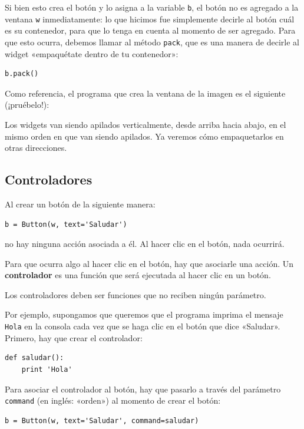 Si bien esto crea el botón y lo asigna a la variable \lstinline!b!, el
botón no es agregado a la ventana \lstinline!w! inmediatamente: lo que
hicimos fue simplemente decirle al botón cuál es su contenedor, para que
lo tenga en cuenta al momento de ser agregado. Para que esto ocurra,
debemos llamar al método \lstinline!pack!, que es una manera de decirle
al widget «empaquétate dentro de tu contenedor»:

\begin{lstlisting}
b.pack()
\end{lstlisting}

Como referencia, el programa que crea la ventana de la imagen es el
siguiente (¡pruébelo!):

Los widgets van siendo apilados verticalmente, desde arriba hacia abajo,
en el mismo orden en que van siendo apilados. Ya veremos cómo
empaquetarlos en otras direcciones.

\subsection{Controladores}

Al crear un botón de la siguiente manera:

\begin{lstlisting}
b = Button(w, text='Saludar')
\end{lstlisting}

no hay ninguna acción asociada a él. Al hacer clic en el botón, nada
ocurrirá.

Para que ocurra algo al hacer clic en el botón, hay que asociarle una
acción. Un \textbf{controlador} es una función que será ejecutada al
hacer clic en un botón.

Los controladores deben ser funciones que no reciben ningún parámetro.

Por ejemplo, supongamos que queremos que el programa imprima el mensaje
\lstinline!Hola! en la consola cada vez que se haga clic en el botón que
dice «Saludar». Primero, hay que crear el controlador:

\begin{lstlisting}
def saludar():
    print 'Hola'
\end{lstlisting}

Para asociar el controlador al botón, hay que pasarlo a través del
parámetro \lstinline!command! (en inglés: «orden») al momento de crear
el botón:

\begin{lstlisting}
b = Button(w, text='Saludar', command=saludar)
\end{lstlisting}

